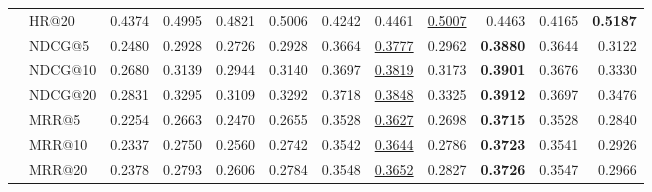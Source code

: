 \begin{tabular}{llrrrrrrrrrr}
 & HR@20 & 0.4374 & 0.4995 & 0.4821 & 0.5006 & 0.4242 & 0.4461 & \underline{0.5007} & 0.4463 & 0.4165 & \textbf{0.5187} \\
 & NDCG@5 & 0.2480 & 0.2928 & 0.2726 & 0.2928 & 0.3664 & \underline{0.3777} & 0.2962 & \textbf{0.3880} & 0.3644 & 0.3122 \\
 & NDCG@10 & 0.2680 & 0.3139 & 0.2944 & 0.3140 & 0.3697 & \underline{0.3819} & 0.3173 & \textbf{0.3901} & 0.3676 & 0.3330 \\
 & NDCG@20 & 0.2831 & 0.3295 & 0.3109 & 0.3292 & 0.3718 & \underline{0.3848} & 0.3325 & \textbf{0.3912} & 0.3697 & 0.3476 \\
 & MRR@5 & 0.2254 & 0.2663 & 0.2470 & 0.2655 & 0.3528 & \underline{0.3627} & 0.2698 & \textbf{0.3715} & 0.3528 & 0.2840 \\
 & MRR@10 & 0.2337 & 0.2750 & 0.2560 & 0.2742 & 0.3542 & \underline{0.3644} & 0.2786 & \textbf{0.3723} & 0.3541 & 0.2926 \\
 & MRR@20 & 0.2378 & 0.2793 & 0.2606 & 0.2784 & 0.3548 & \underline{0.3652} & 0.2827 & \textbf{0.3726} & 0.3547 & 0.2966 \\
\hline
\end{tabular}
